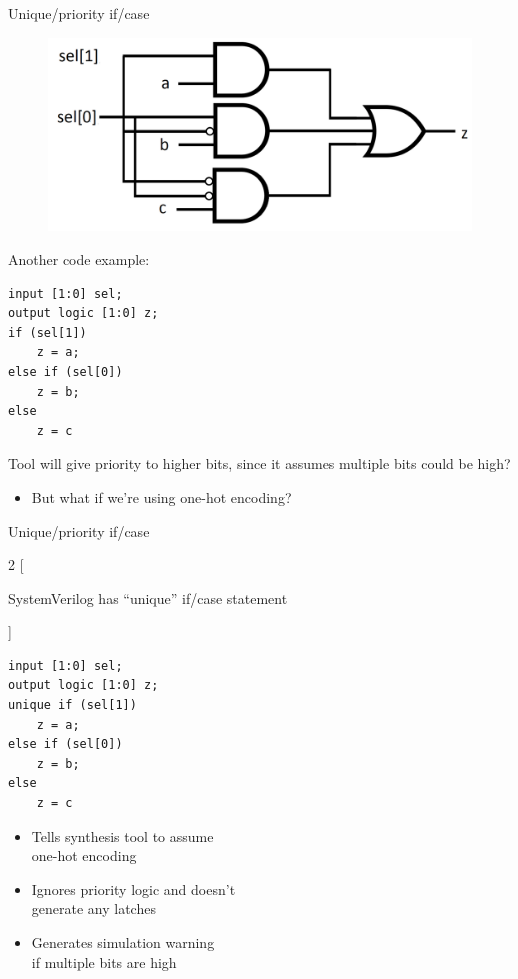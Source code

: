 \documentclass[table,dvipsnames]{beamer}
\begin{document}
 
   \begin{frame}[fragile]{Unique/priority if/case}
   	\begin{figure}
			\centering
			\includegraphics[width=\textwidth]{multiple_bits.png}
	\end{figure}
	

  \begin{block}{Another code example:}
	\begin{verbatim}
input [1:0] sel;
output logic [1:0] z;
if (sel[1])
	z = a;
else if (sel[0])
	z = b;
else
	z = c	
	\end{verbatim}
	\end{block}
	\begin{block}{Tool will give priority to higher bits, since it assumes multiple bits could be high?}
		\begin{itemize}
			\item But what if we're using one-hot encoding?
		\end{itemize}
	\end{block}
\end{frame}
 
 
 
  
  \begin{frame}[fragile]{Unique/priority if/case}
  \begin{multicols}{2}
  [\begin{block}{SystemVerilog has ``unique'' if/case statement} \end{block}]
  \begin{block}{}
	\begin{verbatim}
input [1:0] sel;
output logic [1:0] z;
unique if (sel[1])
	z = a;
else if (sel[0])
	z = b;
else
	z = c	
	\end{verbatim}
	\end{block}
	\begin{block}{}
	\begin{itemize}
		\item Tells synthesis tool to assume \\ one-hot encoding
		\item Ignores priority logic and doesn't \\ generate any latches
		\item Generates simulation warning \\ if multiple bits are high
	\end{itemize}
	\end{block}
	\end{multicols}
\end{frame}
 
\end{document}
